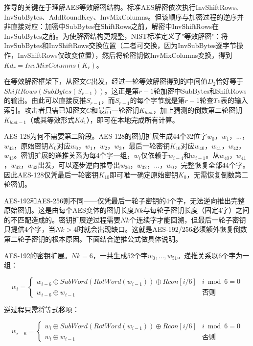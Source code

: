 推导的关键在于理解AES等效解密结构。标准AES解密依次执行InvShiftRows、InvSubBytes、AddRoundKey、InvMixColumns。但该顺序与加密过程的逆序并非直接对应：加密中SubBytes在ShiftRows之前，解密中InvShiftRows在InvSubBytes之前。为使解密结构更规整，NIST标准定义了"等效解密"：将InvSubBytes和InvShiftRows交换位置（二者可交换，因为InvSubBytes逐字节操作，InvShiftRows仅改变位置），然后将轮密钥做InvMixColumns变换，得到$Kd_r = InvMixColumns(K_r)$。

在等效解密框架下，从密文$C$出发，经过一轮等效解密得到的中间值$D_2$恰好等于$ShiftRows(SubBytes(S_{r-1}))$。这正是第$r-1$轮加密中SubBytes和ShiftRows的输出。由此可以直接反推$S_{r-1}$，而$S_{r-1}$的每个字节就是第$r-1$轮查$Te$表的输入索引。攻击者只需已知密文$C$和最后一轮密钥$K_{last}$，加上猜测的倒数第二轮密钥$K_{last-1}$（或其等效形式$Kd_1$），即可在本地完成所有计算。

AES-128为何不需要第二阶段。AES-128的密钥扩展生成44个32位字$w_0$，$w_1$，$...$，$w_{43}$，原始密钥$K_0$对应$w_0$，$w_1$，$w_2$，$w_3$，最后一轮密钥$K_{10}$对应$w_{40}$，$w_{41}$，$w_{42}$，$w_{43}$。密钥扩展的递推关系为每4个字一组，$w_i$仅依赖于$w_{i-4}$和$w_{i-1}$。从$w_{40}$，$w_{41}$，$w_{42}$，$w_{43}$出发，可以逐步逆向推导出$w_{36}$，$w_{32}$，$...$，$w_0$，完整恢复全部44个字。因此AES-128仅凭最后一轮密钥$K_{10}$即可唯一确定原始密钥$K_0$，无需恢复倒数第二轮密钥。

AES-192和AES-256则不同——仅凭最后一轮子密钥的4个字，无法逆向推出完整原始密钥。这是由每个AES变体的密钥长度$Nk$与每轮子密钥长度（固定4字）之间的不匹配造成的。密钥扩展逆过程需要$Nk$个连续字才能回溯，但最后一轮子密钥只提供4个字，当$Nk > 4$时就会出现缺口。这就是AES-192/256必须额外恢复倒数第二轮子密钥的根本原因。下面结合逆推公式做具体说明。

AES-192的密钥扩展。$Nk = 6$，一共生成52个字$w_0, \dots, w_{51}$。递推关系以6个字为一组：

\begin{equation}
w_i = \begin{cases} w_{i-6} \oplus SubWord(RotWord(w_{i-1})) \oplus Rcon[i/6] & i \bmod 6 = 0 \\ w_{i-6} \oplus w_{i-1} & \text{否则} \end{cases}
\end{equation}

逆过程只需将等式移项：

\begin{equation}
w_{i-6} = \begin{cases} w_i \oplus SubWord(RotWord(w_{i-1})) \oplus Rcon[i/6] & i \bmod 6 = 0 \\ w_i \oplus w_{i-1} & \text{否则} \end{cases}
\end{equation}

